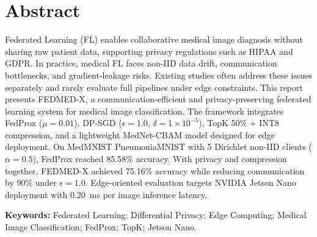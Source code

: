 \chapter*{Abstract}

Federated Learning (FL) enables collaborative medical image diagnosis without
sharing raw patient data, supporting privacy regulations such as HIPAA and
GDPR. In practice, medical FL faces non-IID data drift, communication
bottlenecks, and gradient-leakage risks. Existing studies often address these
issues separately and rarely evaluate full pipelines under edge constraints.
This report presents FEDMED-X, a communication-efficient and
privacy-preserving federated learning system for medical image classification.
The framework integrates FedProx ($\mu = 0.01$), DP-SGD ($\epsilon = 1.0$,
$\delta = 1 \times 10^{-5}$), TopK 50\% + INT8 compression, and a lightweight
MedNet-CBAM model designed for edge deployment. On MedMNIST PneumoniaMNIST
with 5 Dirichlet non-IID clients ($\alpha = 0.5$), FedProx reached 85.58\%
accuracy. With privacy and compression together, FEDMED-X achieved 75.16\%
accuracy while reducing communication by 90\% under $\epsilon = 1.0$.
Edge-oriented evaluation targets NVIDIA Jetson Nano deployment with 0.20~ms per
image inference latency.

\vspace{6pt}
\noindent\textbf{Keywords:} Federated Learning; Differential Privacy; Edge
Computing; Medical Image Classification; FedProx; TopK; Jetson Nano.
